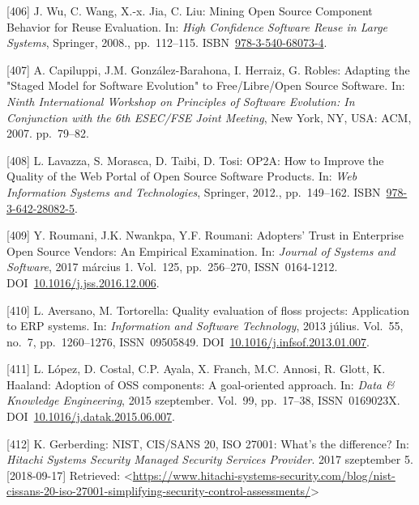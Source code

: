 \documentclass[12pt,magyar,a4paper,oneside]{scrreprt}
\begin{document}
\leavevmode\hypertarget{ref-wu_mining_2008}{}%
{[}406{]} J. Wu, C. Wang, X.-x. Jia, C. Liu: Mining Open Source
Component Behavior for Reuse Evaluation. In: \emph{High Confidence
Software Reuse in Large Systems}, Springer, 2008., pp.~112--115.
ISBN~\href{https://worldcat.org/isbn/978-3-540-68073-4}{978-3-540-68073-4}.

\leavevmode\hypertarget{ref-capiluppi_adapting_2007}{}%
{[}407{]} A. Capiluppi, J.M. González-Barahona, I. Herraiz, G. Robles:
Adapting the "Staged Model for Software Evolution" to Free/Libre/Open
Source Software. In: \emph{Ninth International Workshop on Principles of
Software Evolution: In Conjunction with the 6th ESEC/FSE Joint Meeting},
New York, NY, USA: ACM, 2007. pp.~79--82.

\leavevmode\hypertarget{ref-lavazza_op2a_2012}{}%
{[}408{]} L. Lavazza, S. Morasca, D. Taibi, D. Tosi: OP2A: How to
Improve the Quality of the Web Portal of Open Source Software Products.
In: \emph{Web Information Systems and Technologies}, Springer, 2012.,
pp.~149--162.
ISBN~\href{https://worldcat.org/isbn/978-3-642-28082-5}{978-3-642-28082-5}.

\leavevmode\hypertarget{ref-roumani_adopters_2017}{}%
{[}409{]} Y. Roumani, J.K. Nwankpa, Y.F. Roumani: Adopters' Trust in
Enterprise Open Source Vendors: An Empirical Examination. In:
\emph{Journal of Systems and Software}, 2017 március 1. Vol.~125,
pp.~256--270, ISSN~0164-1212.
DOI~\href{https://doi.org/10.1016/j.jss.2016.12.006}{10.1016/j.jss.2016.12.006}.

\leavevmode\hypertarget{ref-aversano_quality_2013}{}%
{[}410{]} L. Aversano, M. Tortorella: Quality evaluation of floss
projects: Application to ERP systems. In: \emph{Information and Software
Technology}, 2013 július. Vol.~55, no.~7, pp.~1260--1276, ISSN~09505849.
DOI~\href{https://doi.org/10.1016/j.infsof.2013.01.007}{10.1016/j.infsof.2013.01.007}.

\leavevmode\hypertarget{ref-lopez_adoption_2015}{}%
{[}411{]} L. López, D. Costal, C.P. Ayala, X. Franch, M.C. Annosi, R.
Glott, K. Haaland: Adoption of OSS components: A goal-oriented approach.
In: \emph{Data \& Knowledge Engineering}, 2015 szeptember. Vol.~99,
pp.~17--38, ISSN~0169023X.
DOI~\href{https://doi.org/10.1016/j.datak.2015.06.007}{10.1016/j.datak.2015.06.007}.

\leavevmode\hypertarget{ref-gerberding_nist_2017}{}%
{[}412{]} K. Gerberding: NIST, CIS/SANS 20, ISO 27001: What's the
difference? In: \emph{Hitachi Systems Security \textbar{} Managed
Security Services Provider}. 2017 szeptember 5. {[}2018-09-17{]}
Retrieved:
\textless{}\url{https://www.hitachi-systems-security.com/blog/nist-cissans-20-iso-27001-simplifying-security-control-assessments/}\textgreater{}
\end{document}
